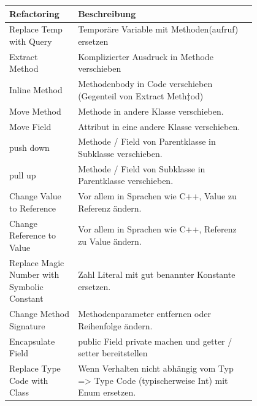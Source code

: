 \documentclass[a4paper, fontsize=6pt]{scrartcl}
\begin{document}
\begin{multicols*}{5}
\begin{tabular}{|p{0.2\linewidth}|p{0.6\linewidth}|}
 \hline
 Refactoring & Beschreibung \\ 
 \hline
 Replace Temp with Query & Temporäre Variable mit Methoden(aufruf) ersetzen \\ 
 \hline
 Extract Method & Komplizierter Ausdruck in Methode verschieben \\ 
 \hline
 Inline Method & Methodenbody in Code verschieben (Gegenteil von Extract Meth‡od) \\ 
 \hline
 Move Method & Methode in andere Klasse verschieben. \\ 
 \hline
 Move Field & Attribut in eine andere Klasse verschieben. \\ 
 \hline
 push down & Methode / Field von Parentklasse in Subklasse verschieben. \\ 
 \hline
 pull up & Methode / Field von Subklasse in Parentklasse verschieben. \\ 
 \hline
 Change Value to Reference & Vor allem in Sprachen wie C++, Value zu Referenz ändern. \\ 
 \hline
 Change Reference to Value & Vor allem in Sprachen wie C++, Referenz zu Value ändern. \\ 
 \hline
 Replace Magic Number with Symbolic Constant & Zahl Literal mit gut benannter Konstante ersetzen. \\ 
 \hline
 Change Method Signature & Methodenparameter entfernen oder Reihenfolge ändern. \\ 
 \hline
 Encapsulate Field & public Field private machen und getter / setter bereitstellen \\ 
 \hline
 Replace Type Code with Class & Wenn Verhalten nicht abhängig vom Typ => Type Code (typischerweise Int) mit Enum ersetzen. \\ 
 \hline

\end{tabular}
\end{multicols*}
\end{document}
